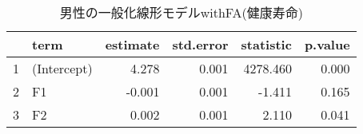 \begin{table}[ht]
\centering
\begingroup\tiny
\begin{tabular}{rlrrrr}
  \hline
 & term & estimate & std.error & statistic & p.value \\ 
  \hline
1 & (Intercept) & 4.278 & 0.001 & 4278.460 & 0.000 \\ 
  2 & F1 & -0.001 & 0.001 & -1.411 & 0.165 \\ 
  3 & F2 & 0.002 & 0.001 & 2.110 & 0.041 \\ 
   \hline
\end{tabular}
\endgroup
\caption{男性の一般化線形モデルwithFA(健康寿命)} 
\label{table_Gamma_HLE_FA_m}
\end{table}
